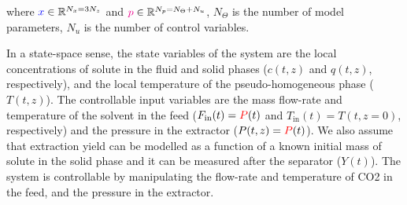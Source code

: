 \documentclass[../Article_Model_Parameters.tex]{subfiles}
\begin{document}
			where ${\color{blue}x} \in \mathbb{R}^{N_x = 3N_z} $ and ${\color{magenta}p} \in \mathbb{R}^{N_p =  N_{\Theta} + N_u } $, $N_{\Theta}$ is the number of model parameters, $N_{u}$ is the number of control variables.
			
			{\color{blue} In a state-space sense, the state variables of the system are the local concentrations of solute in the fluid and solid phases ($c(t,z)$ and $q(t,z)$, respectively), and the local temperature of the pseudo-homogeneous phase ($T(t,z)$). The controllable input variables are the mass flow-rate and temperature of the solvent in the feed ($F_\text{in}(t) = {\color{red}P}(t)$ and $T_\text{in}(t) = T(t,z=0)$, respectively) and the pressure in the extractor ($P(t,z) ={\color{red}P}(t)$). {\color{red}We also assume that extraction yield can be modelled as a function of a known initial mass of solute in the solid phase and it can be measured after the separator ($Y(t)$).} The system is controllable by manipulating the flow-rate and temperature of CO2 in the feed, and the pressure in the extractor. }
			
			
\end{document}
